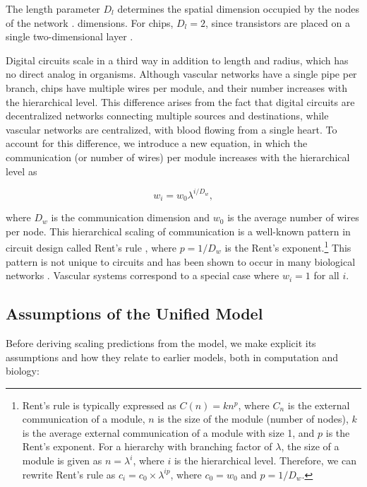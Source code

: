 \documentclass[12pt]{article}
\begin{document}
The length parameter $D_l$ determines the spatial dimension occupied 
by the nodes of the network \cite{mandelbrot83}.
dimensions.  For chips, $D_l = 2$, since transistors are placed on a 
single two-dimensional layer \cite{donath81}.

Digital circuits scale in a third way in addition to length and
radius, which has no direct 
analog in organisms. Although vascular networks have a single pipe per 
branch, chips have multiple wires per module, and their number 
increases with the hierarchical level. This difference arises from the 
fact that digital circuits are decentralized networks connecting 
multiple sources and destinations, while vascular networks are 
centralized, with blood flowing from a single heart. To account for 
this difference, we introduce a new equation, in which the 
communication (or number of wires) per module increases with the 
hierarchical level as

\begin{equation}
w_i = w_0 \lambda^{i/D_w},
\label{eq:communication}
\end{equation}

\noindent where $D_w$ is the communication dimension and $w_0$ is the average
number of wires per node.  This hierarchical scaling of communication is a
well-known pattern in circuit design called Rent's rule \cite{christie00},
where $p = 1/D_w$ is the Rent's exponent.\footnote{Rent's rule is typically
  expressed as $C(n) = kn^p$, where $C_n$ is the external communication of a
  module, $n$ is the size of the module (number of nodes), $k$ is the average
  external communication of a module with size 1, and $p$ is the Rent’s
  exponent. For a hierarchy with branching factor of $\lambda$, the size of a
  module is given as $n = \lambda^i$, where $i$ is the hierarchical level.
  Therefore, we can rewrite Rent’s rule as $c_i = c_0 \times \lambda^{ip}$,
where $c_0 = w_0$ and $p = 1 / D_w$.} This pattern is not unique to circuits
and has been shown to occur in many biological networks
\cite{reda09,bassett10}.   Vascular systems correspond to a special case where 
$w_i = 1$ for all $i$. 

\subsection{Assumptions of the Unified Model}
\label{sec:assumptions}

Before deriving scaling predictions from the model, we make explicit
its  assumptions and how they relate to earlier models, both in
computation and biology:
\end{document}
